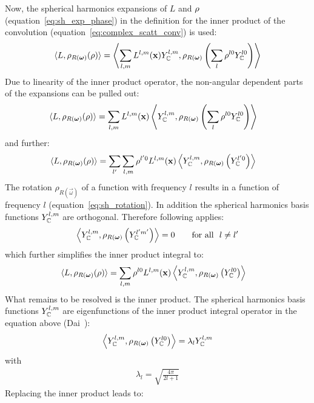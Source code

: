 Now, the spherical harmonics expansions of $L$ and $\rho$ (equation~\ref{eq:sh_exp_phase}) in the definition for the inner product of the convolution (equation~\ref{eq:complex_scatt_conv}) is used:
\begin{align*}
\langle L,  \rho_{R(\boldsymbol{\mathbf{\omega}})}(\rho)\rangle = \left < \sum_{l,m}{L^{l,m}(\boldsymbol{\mathbf{x}}) Y_{\mathbb{C}}^{l,m}}, \rho_{R(\boldsymbol{\mathbf{\omega}})}\left ( \sum_{l}{\rho^{l0}Y_{\mathbb{C}}^{l0}} \right )\right>
\end{align*}
Due to linearity of the inner product operator, the non-angular dependent parts of the expansions can be pulled out:
\begin{align*}
\langle L,  \rho_{R(\boldsymbol{\mathbf{\omega}})}(\rho)\rangle
&=
\sum_{l,m}
{
L^{l,m}(\boldsymbol{\mathbf{x}})
\left<
Y_{\mathbb{C}}^{l,m},
\rho_{R(\boldsymbol{\mathbf{\omega}})}
\left(\sum_l{\rho^{l0} Y_{\mathbb{C}}^{l0}}\right)
\right>
}
\end{align*}
and further:
\begin{align*}
\langle L,  \rho_{R(\boldsymbol{\mathbf{\omega}})}(\rho)\rangle
&=
\sum_{l'}
{
\sum_{l,m}
{
\rho^{l'0}L^{l,m}(\boldsymbol{\mathbf{x}})
\left<Y_{\mathbb{C}}^{l,m}, \rho_{R(\boldsymbol{\mathbf{\omega}})}\left( Y_{\mathbb{C}}^{l'0} \right)\right>
}
}
\end{align*}
The rotation $\rho_{R(\vec{\omega})}$ of a function with frequency $l$ results in a function of frequency $l$ (equation~\ref{eq:sh_rotation}). In addition the spherical harmonics basis functions $Y_{\mathbb{C}}^{l,m}$ are orthogonal. Therefore following applies:
\begin{align*}
\left<
Y_{\mathbb{C}}^{l,m}, \rho_{R(\boldsymbol{\mathbf{\omega}})}\left(Y_{\mathbb{C}}^{l'm'}\right)
\right> = 0       \qquad    \text{for all}\ \ l\ne l' 
\end{align*}
which further simplifies the inner product integral to:
\begin{align*}
\langle L,  \rho_{R(\boldsymbol{\mathbf{\omega}})}(\rho)\rangle
&=
\sum_{l,m}
{
\rho^{l0}L^{l,m}(\boldsymbol{\mathbf{x}})
\left<
Y_{\mathbb{C}}^{l,m}, \rho_{R(\boldsymbol{\mathbf{\omega}})}\left(Y_{\mathbb{C}}^{l0} \right )
\right>
}
\end{align*}
What remains to be resolved is the inner product. The spherical harmonics basis functions $ Y_{\mathbb{C}}^{l,m}$ are eigenfunctions of the inner product integral operator in the equation above (Dai~\cite{Dai13}):
\begin{align*}
\left<
Y_{\mathbb{C}}^{l,m}, \rho_{R(\boldsymbol{\mathbf{\omega}})}\left ( Y_{\mathbb{C}}^{l0} \right )\right> = \lambda_l Y_{\mathbb{C}}^{l,m}
\end{align*}
with
\begin{align*}
\lambda_l=\sqrt{\frac{4\pi}{2l+1}}
\end{align*}
Replacing the inner product leads to:
